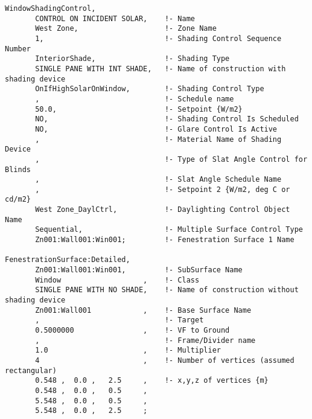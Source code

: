 \begin{lstlisting}
WindowShadingControl,
       CONTROL ON INCIDENT SOLAR,    !- Name
       West Zone,                    !- Zone Name
       1,                            !- Shading Control Sequence Number
       InteriorShade,                !- Shading Type
       SINGLE PANE WITH INT SHADE,   !- Name of construction with shading device
       OnIfHighSolarOnWindow,        !- Shading Control Type
       ,                             !- Schedule name
       50.0,                         !- Setpoint {W/m2}
       NO,                           !- Shading Control Is Scheduled
       NO,                           !- Glare Control Is Active
       ,                             !- Material Name of Shading Device
       ,                             !- Type of Slat Angle Control for Blinds
       ,                             !- Slat Angle Schedule Name
       ,                             !- Setpoint 2 {W/m2, deg C or cd/m2}
       West Zone_DaylCtrl,           !- Daylighting Control Object Name
       Sequential,                   !- Multiple Surface Control Type
       Zn001:Wall001:Win001;         !- Fenestration Surface 1 Name

FenestrationSurface:Detailed,
       Zn001:Wall001:Win001,         !- SubSurface Name
       Window                   ,    !- Class
       SINGLE PANE WITH NO SHADE,    !- Name of construction without shading device
       Zn001:Wall001            ,    !- Base Surface Name
       ,                             !- Target
       0.5000000                ,    !- VF to Ground
       ,                             !- Frame/Divider name
       1.0                      ,    !- Multiplier
       4                        ,    !- Number of vertices (assumed rectangular)
       0.548 ,  0.0 ,   2.5     ,    !- x,y,z of vertices {m}
       0.548 ,  0.0 ,   0.5     ,
       5.548 ,  0.0 ,   0.5     ,
       5.548 ,  0.0 ,   2.5     ;
\end{lstlisting}

